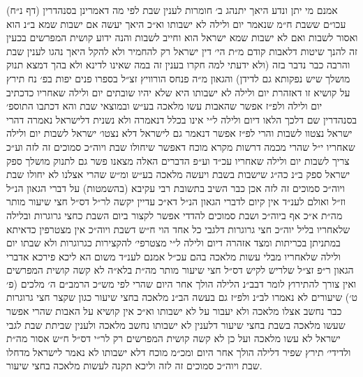 \documentclass[12pt, openany]{book}
\begin{document}
\begin{multicols}{2}
אמנם מי יתן ונדע היאך יתנהג ב׳ חומרות לענין שבת לפי מה דאמרינן בסנהדרין (דף נ״ח) עכו״ם ששבת ח״מ שנאמר יום ולילה לא ישבותו וא״כ היאך יעשה אם ישבות שמא ב״נ הוא ואסור לשבות ואם לא ישבות שמא ישראל הוא וחייב לשבות והנה ידוע קושית המפרשים בכעין זה להנך שיטות דלאבות קודם מ״ת הי׳ דין ישראל רק להחמיר ולא להקל היאך נהגו לענין שבת והרבה כבר נדבר בזה (ולא ידעתי למה חקרו בענין זה במה שאינו לדינא ולא בהך דמצא תנוק מושלך שיש נפקותא גם לדידן) והגאון מ״ה פנחס הורוויץ זצ״ל בספרו פנים יפות בפ׳ נח תירץ על קושיא זו דאזהרת יום ולילה לא ישבותו היא שלא יהיו שובתים יום ולילה שאחריו כדכתיב יום ולילה ולפ״ז אפשר שהאבות עשו מלאכה בע״ש ובמוצאי שבת והא דכתבו התוספ׳ בסנהדרין שם דלכך הלאו דיום ולילה ל״י אינו בכלל דנאמרה ולא נשנית דלישראל נאמרה דהרי ישראל נצטוו לשבות והרי לפ״ז אפשר דנאמר גם לישראל דלא נצטו׳ ישראל לשבות יום ולילה שאחריו י״ל שהרי מכמה דרשות מקרא מוכח דאפשר שיחולו שבת ויוה״כ סמוכים זה לזה וע״כ צריך לשבות יום ולילה שאחריו עכ״ד וע״פ הדברים האלה מצאנו פשר גם לתנוק מושלך ספק ישראל ספק ב״נ כה״ג שישבות בשבת ויעשה מלאכה בע״ש ומ״ש שהרי אצלנו לא יחולו שבת ויוה״כ סמוכים זה לזה אכן כבר השיב בתשובת רבי עקיבא (בהשמטות) על דברי הגאון הנ״ל וז״ל ואולם לענ״ד אין קיום לדברי הגאון הנ״ל דא״כ עדיין יקשה לר״ל דס״ל חצי שיעור מותר מה״ת א״כ אף ביוה״כ ושבת סמוכים להדדי אפשר לקצור ביום השבת כחצי גרוגרות ובלילה שלאחריו בליל יוה״כ חצי גרוגרות דלגבי כל אחד הוי ח״ש דשבת ויוה״כ אין מצטרפין כדאיתא במתניתן בכריתות ומצד אזהרה דיום ולילה ל״י מצטרפי׳ להקצירות כגרוגרות ולא שבתו יום ולילה שלאחריו מבלי עשות מלאכה בהם עכ״ל אמנם לענ״ד משום הא ליכא פירכא אדברי הגאון ר״פ זצ״ל שלריש לקיש דס״ל חצי שיעור מותר מה״ת בלא״ה לא קשה קושית המפרשים ואין צורך להתירוץ לומר דבב״נ הלילה הולך אחר היום שהרי לפי מש״כ הרמב״ם ה׳ מלכים (פ׳ ט׳) שיעורים לא נאמרו לב״נ ולפ״ז גם בעשה הב״נ מלאכה בחצי שיעור כגון שקצר חצי גרוגרות כבר נחשב אצלו מלאכה ולא יעבור על לא ישבותו וא״כ אין קושיא על האבות שהרי אפשר שעשו מלאכה בשבת בחצי שיעור דלענין לא ישבותו נחשב מלאכה ולענין שביתת שבת לגבי ישראל לא עשו מלאכה ועל כן לא קשה קושית המפרשים רק לר״י דס״ל ח״ש אסור מה״ת ולדידי׳ תירץ שפיר דלילה הולך אחר היום ומכ״מ מוכח דלא ישבותו לא נאמר לישראל מדחלו שבת ויוה״כ סמוכים זה לזה וליכא תקנה לעשות מלאכה בחצי שיעור.\\\vspace{0pt}


\end{multicols}
\end{document}
